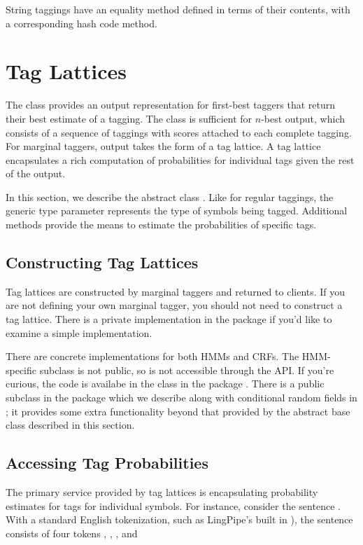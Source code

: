String taggings have an equality method defined in terms of their
contents, with a corresponding hash code method.


\section{Tag Lattices}

The  class provides an output representation for
first-best taggers that return their best estimate of a tagging.  The
 class is sufficient for $n$-best output, which
consists of a sequence of taggings with scores attached to each
complete tagging.  For marginal taggers, output takes the form of a
tag lattice.  A tag lattice encapsulates a rich computation of
probabilities for individual tags given the rest of the output.

In this section, we describe the abstract class .
Like for regular taggings, the generic type parameter 
represents the type of symbols being tagged.  Additional methods
provide the means to estimate the probabilities of specific tags.

\subsection{Constructing Tag Lattices}

Tag lattices are constructed by marginal taggers and returned to
clients.  If you are not defining your own marginal tagger, you should
not need to construct a tag lattice.  There is a private
implementation in the  package if you'd like to examine a
simple implementation.  

There are concrete implementations for both HMMs and CRFs.  The
HMM-specific subclass is not public, so is not accessible through the
API.  If you're curious, the code is availabe in the class
 in the package .  There is
a public subclass  in the 
package which we describe along with conditional random fields in
; it provides some extra functionality beyond that provided
by the abstract base class described in this section.

\subsection{Accessing Tag Probabilities}

The primary service provided by tag lattices is encapsulating
probability estimates for tags for individual symbols.  For instance,
consider the sentence .  With a
standard English tokenization, such as LingPipe's built in
), the sentence consists of four
tokens , ,
, and   

